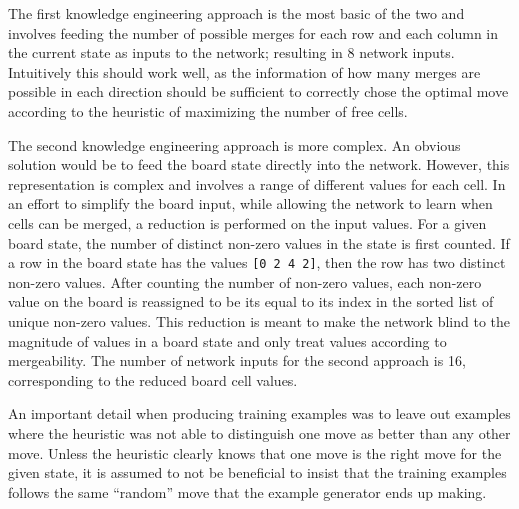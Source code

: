 The first knowledge engineering approach is the most basic of the two and involves feeding the number of possible merges for each row and each column in the current state as inputs to the network; resulting in 8 network inputs. Intuitively this should work well, as the information of how many merges are possible in each direction should be sufficient to correctly chose the optimal move according to the heuristic of maximizing the number of free cells.

The second knowledge engineering approach is more complex. An obvious solution would be to feed the board state directly into the network. However, this representation is complex and involves a range of different values for each cell. In an effort to simplify the board input, while allowing the network to learn when cells can be merged, a reduction is performed on the input values. For a given board state, the number of distinct non-zero values in the state is first counted. If a row in the board state has the values \texttt{[0 2 4 2]}, then the row has two distinct non-zero values. After counting the number of non-zero values, each non-zero value on the board is reassigned to be its equal to its index in the sorted list of unique non-zero values. This reduction is meant to make the network blind to the magnitude of values in a board state and only treat values according to mergeability. The number of network inputs for the second approach is 16, corresponding to the reduced board cell values.

An important detail when producing training examples was to leave out examples where the heuristic was not able to distinguish one move as better than any other move. Unless the heuristic clearly knows that one move is the right move for the given state, it is assumed to not be beneficial to insist that the training examples follows the same ``random'' move that the example generator ends up making.

